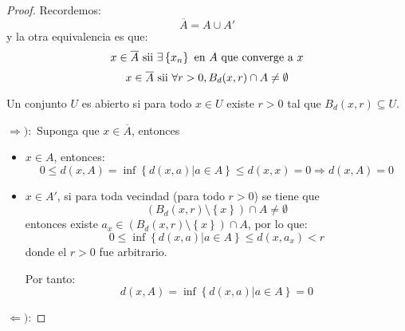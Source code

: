 \documentclass[12pt]{report}
\newcounter{it}
\theoremstyle{largebreak}
\begin{document}
    \begin{proof}
        Recordemos:
        \begin{equation*}
            \overline{A}=A\cup A'
        \end{equation*}
        y la otra equivalencia es que:
        \begin{equation*}
            x\in\overline{A}\textup{ sii }\exists \left\{x_n \right\}\textup{ en }A \textup{ que converge a $x$}
        \end{equation*}
        \begin{equation*}
            x\in\overline{A}\textup{ sii }\forall r>0, B_d(x,r)\cap A\neq\emptyset
        \end{equation*}

        Un conjunto $U$ es abierto si para todo $x\in U$ existe $r>0$ tal que $B_d(x,r)\subseteq U$.

        \begin{center}
            
        \end{center}

        $\Rightarrow):$ Suponga que $x\in\overline{A}$, entonces
        \begin{itemize}
            \item $x\in A$, entonces:
            \begin{equation*}
                0\leq d(x,A)=\inf\left\{d(x,a)\Big|a\in A \right\}\leq d(x,x)=0
                \Rightarrow d(x,A)=0
            \end{equation*}
            \item $x\in A'$, si para toda vecindad (para todo $r>0$) se tiene que
            \begin{equation*}
                (B_d(x,r)\setminus\left\{x\right\})\cap A\neq\emptyset
            \end{equation*}
            entonces existe $a_x\in(B_d(x,r)\setminus\left\{x\right\})\cap A$, por lo que:
            \begin{equation*}
                0\leq\inf\left\{d(x,a)\Big|a\in A \right\}\leq d(x,a_x)<r
            \end{equation*}
            donde el $r>0$ fue arbitrario.

            Por tanto:
            \begin{equation*}
                d(x,A)=\inf\left\{d(x,a)\Big|a\in A \right\}=0
            \end{equation*}
        \end{itemize}

        $\Leftarrow)$: 
    \end{proof}
\end{document}

